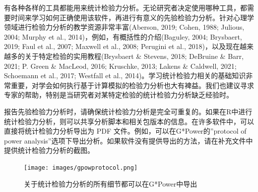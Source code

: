 \documentclass[
  letterpaper,
  DIV=11,
  numbers=noendperiod]{scrreprt}
\newenvironment{Shaded}{\begin{snugshade}}{\end{snugshade}}
\newcommand{\AttributeTok}[1]{\textcolor[rgb]{0.40,0.45,0.13}{#1}}
\newcommand{\CommentTok}[1]{\textcolor[rgb]{0.37,0.37,0.37}{#1}}
\newcommand{\ControlFlowTok}[1]{\textcolor[rgb]{0.00,0.23,0.31}{#1}}
\newcommand{\DecValTok}[1]{\textcolor[rgb]{0.68,0.00,0.00}{#1}}
\newcommand{\FloatTok}[1]{\textcolor[rgb]{0.68,0.00,0.00}{#1}}
\newcommand{\FunctionTok}[1]{\textcolor[rgb]{0.28,0.35,0.67}{#1}}
\newcommand{\NormalTok}[1]{\textcolor[rgb]{0.00,0.23,0.31}{#1}}
\newcommand{\OtherTok}[1]{\textcolor[rgb]{0.00,0.23,0.31}{#1}}
\newcommand{\SpecialCharTok}[1]{\textcolor[rgb]{0.37,0.37,0.37}{#1}}
\begin{document}
\begin{Shaded}
\end{Shaded}

有各种各样的工具都能用来统计检验力分析。无论研究者决定使用哪种工具，都需要时间来学习如何正确使用该软件，再进行有意义的先验检验力分析。针对心理学领域进行检验力分析的教学资源非常丰富(Aberson,
2019; Cohen, 1988; Julious, 2004; Murphy et al.,
2014)，例如，有概括性的介绍(Baguley, 2004; Brysbaert, 2019; Faul et al.,
2007; Maxwell et al., 2008; Perugini et al.,
2018)，以及现在越来越多的关于特定检验的实用教程(Brysbaert \& Stevens,
2018; DeBruine \& Barr, 2021; P. Green \& MacLeod, 2016; Kruschke, 2013;
Lakens \& Caldwell, 2021; Schoemann et al., 2017; Westfall et al.,
2014)。学习统计检验力相关的基础知识非常重要，对学会如何执行基于计算模拟的检验力分析也大有裨益。我们也建议寻求专家的帮助，特别是当研究者对某特定检验的统计检验力分析缺乏经验时。

报告先验检验力分析时，请确保统计检验力分析是完全可重复的。如果在R中进行统计检验力分析，则可以共享分析脚本和相关包版本的信息。在许多软件中，可以直接将统计检验力分析导出为
PDF 文件。例如，可以在G*Power的''protocol of power
analysis''选项下导出分析。如果软件没有提供导出的方法，请在补充文件中提供统计检验力分析的截图。

\begin{figure}

{\centering \texttt{[image: images/gpowprotocol.png]}

}

\caption{\label{fig-gpowprotocol}关于统计检验力分析的所有细节都可以在G*Power中导出}

\end{figure}
\end{document}
